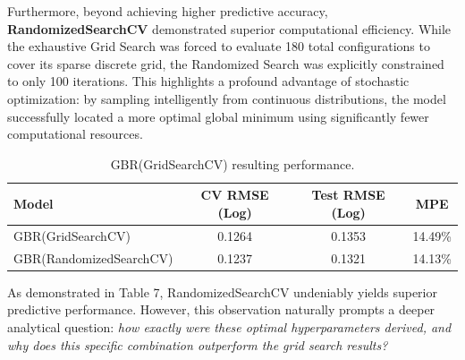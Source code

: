 \documentclass[11pt]{article}
\begin{document}
\noindent Furthermore, beyond achieving higher predictive accuracy, \textbf{RandomizedSearchCV} \break demonstrated superior computational efficiency. While the exhaustive Grid Search was forced to evaluate 180 total configurations to cover its sparse discrete grid, the Randomized Search was explicitly constrained to only 100 iterations. This highlights a profound advantage of stochastic optimization: by sampling intelligently from continuous distributions, the model successfully located a more optimal global minimum using significantly fewer computational resources.

\begin{table}[H]
    \centering
    \renewcommand{\arraystretch}{1.2}
    \begin{tabular}{lccc}
        \toprule
        \textbf{Model} & \textbf{CV RMSE (Log)} & \textbf{Test RMSE (Log)} & \textbf{MPE} \\
        \midrule
        GBR(GridSearchCV) & 0.1264 & 0.1353 & 14.49\% \\
        GBR(RandomizedSearchCV) & 0.1237 & 0.1321 & 14.13\% \\
        \bottomrule
    \end{tabular}
    \caption{GBR(GridSearchCV) resulting performance.}
    \label{tab:RandomizedSearchCV_model_performance}
\end{table}

\noindent As demonstrated in Table 7, RandomizedSearchCV undeniably yields superior predictive performance. However, this observation naturally prompts a deeper analytical question: \textit{how exactly were these optimal hyperparameters derived, and why does this specific combination outperform the grid search results?}
\end{document}
